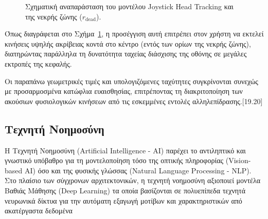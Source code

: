 \documentclass[twoside, a4paper, 11pt]{article}
\newcommand{\textlatin}[1]{\textenglish{#1}}
\begin{document}
\begin{figure}[H]
\centering
{}
\caption{Σχηματική αναπαράσταση του μοντέλου Joystick Head Tracking και της νεκρής ζώνης ($r_{\text{dead}}$).}
\label{fig:joystick_deadzone}
\end{figure}

Όπως διαγράφεται στο Σχήμα~\ref{fig:joystick_deadzone}, η προσέγγιση αυτή επιτρέπει στον χρήστη να εκτελεί κινήσεις υψηλής ακρίβειας κοντά στο κέντρο (εντός των ορίων της νεκρής ζώνης), διατηρώντας παράλληλα τη δυνατότητα ταχείας διάσχισης της οθόνης σε μεγάλες εκτροπές της κεφαλής.

Οι παραπάνω γεωμετρικές τιμές και υπολογιζόμενες ταχύτητες συγκρίνονται συνεχώς με προσαρμοσμένα κατώφλια ευαισθησίας, επιτρέποντας τη διακριτοποίηση των ακούσιων φυσιολογικών κινήσεων από τις εσκεμμένες εντολές αλληλεπίδρασης.[19.20]
\subsection{Τεχνητή Νοημοσύνη}
Η Τεχνητή Νοημοσύνη (\textlatin{Artificial Intelligence - AI}) παρέχει το αντιληπτικό και γνωστικό υπόβαθρο 
για τη μοντελοποίηση τόσο της οπτικής πληροφορίας (\textlatin{Vision-based AI}) όσο και της φυσικής γλώσσας
(\textlatin{Natural Language Processing - NLP}). 
Στο πλαίσιο των σύγχρονων αρχιτεκτονικών, η τεχνητή νοημοσύνη αξιοποιεί μοντέλα Βαθιάς Μάθησης (\textlatin{Deep Learning}) τα οποία
βασίζονται σε πολυεπίπεδα τεχνητά νευρωνικά δίκτυα για την αυτόματη εξαγωγή μοτίβων και χαρακτηριστικών από ακατέργαστα δεδομένα 
\end{document}
